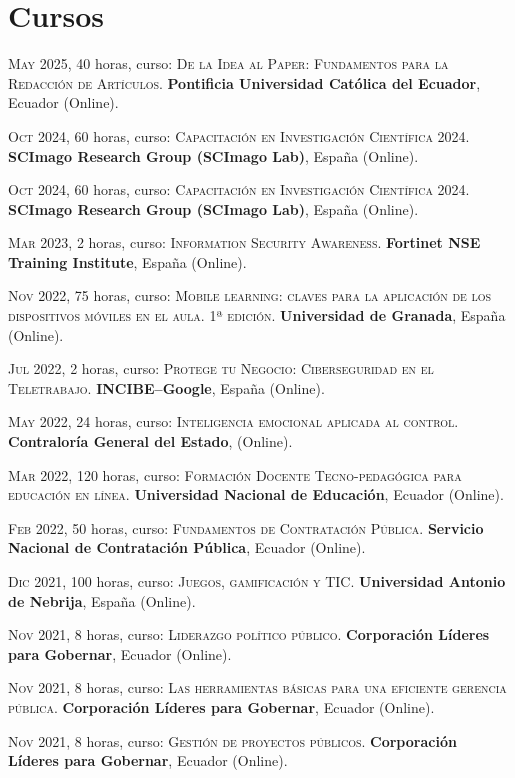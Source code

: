 \documentclass[a4paper]{article}
\begin{document}
\section{Cursos }

\textsc{May} 2025, 40 horas, curso: \textsc{De la Idea al Paper: Fundamentos para la Redacción de Artículos}.
\textbf{Pontificia Universidad Católica del Ecuador}, Ecuador (Online).


\textsc{Oct} 2024, 60 horas, curso: \textsc{Capacitación en Investigación Científica 2024}.
\textbf{SCImago Research Group (SCImago Lab)}, España (Online).


\textsc{Oct} 2024, 60 horas, curso: \textsc{Capacitación en Investigación Científica 2024}.
\textbf{SCImago Research Group (SCImago Lab)}, España (Online).

\textsc{Mar} 2023, 2 horas, curso: \textsc{Information Security Awareness}.
\textbf{Fortinet NSE Training Institute}, España (Online).

\textsc{Nov} 2022, 75 horas, curso: \textsc{Mobile learning: claves para la aplicación de los dispositivos móviles en el aula. 1ª edición}.
\textbf{Universidad de Granada}, España (Online).

\textsc{Jul} 2022, 2 horas, curso: \textsc{Protege tu Negocio: Ciberseguridad en el Teletrabajo}.
\textbf{INCIBE--Google}, España (Online).

\textsc{May} 2022, 24 horas, curso: \textsc{Inteligencia emocional aplicada al control}.
\textbf{Contraloría General del Estado}, (Online).

\textsc{Mar} 2022, 120 horas, curso: \textsc{Formación Docente Tecno-pedagógica para educación en línea}.
\textbf{Universidad Nacional de Educación}, Ecuador (Online).

\textsc{Feb} 2022, 50 horas, curso: \textsc{Fundamentos de Contratación Pública}.
\textbf{Servicio Nacional de Contratación Pública}, Ecuador (Online).

\textsc{Dic} 2021, 100 horas, curso: \textsc{Juegos, gamificación y TIC}.
\textbf{Universidad Antonio de Nebrija}, España (Online).

\textsc{Nov} 2021, 8 horas, curso: \textsc{Liderazgo político público}.
\textbf{Corporación Líderes para Gobernar}, Ecuador (Online).

\textsc{Nov} 2021, 8 horas, curso: \textsc{Las herramientas básicas para una eficiente gerencia pública}.
\textbf{Corporación Líderes para Gobernar}, Ecuador (Online).

\textsc{Nov} 2021, 8 horas, curso: \textsc{Gestión de proyectos públicos}.
\textbf{Corporación Líderes para Gobernar}, Ecuador (Online).
\end{document}
